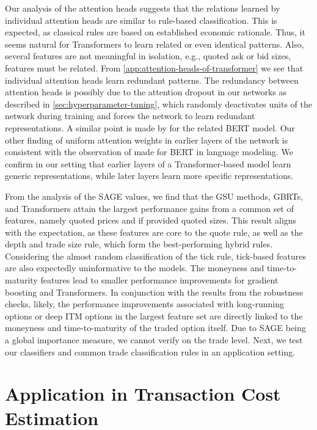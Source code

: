 Our analysis of the attention heads suggests that the relations learned by individual attention heads are similar to rule-based classification. This is expected, as classical rules are based on established economic rationale. Thus, it seems natural for Transformers to learn related or even identical patterns. Also, several features are not meaningful in isolation, e.g., quoted ask or bid sizes, features must be related. From \cref{app:attention-heads-of-transformer} we see that individual attention heads learn redundant patterns. The redundancy between attention heads is possibly due to the attention dropout in our networks as described in \cref{sec:hyperparameter-tuning}, which randomly deactivates units of the network during training and forces the network to learn redundant representations. A similar point is made by \textcite[][283--284]{clarkWhatDoesBERT2019} for the related \gls{BERT} model. Our other finding of uniform attention weights in earlier layers of the network is consistent with the observation of \textcite[][4193]{abnarQuantifyingAttentionFlow2020} made for \gls{BERT} in language modeling. We confirm in our setting that earlier layers of a Transformer-based model learn generic representations, while later layers learn more specific representations.

From the analysis of the \gls{SAGE} values, we find that the \gls{GSU} methods, \glspl{GBRT}, and Transformers attain the largest performance gains from a common set of features, namely quoted prices and if provided quoted sizes. This result aligns with the expectation, as these features are core to the quote rule, as well as the depth and trade size rule, which form the best-performing hybrid rules. Considering the almost random classification of the tick rule, tick-based features are also expectedly uninformative to the models. The moneyness and time-to-maturity features lead to smaller performance improvements for gradient boosting and Transformers. In conjunction with the results from the robustness checks, likely, the performance improvements associated with long-running options or deep \gls{ITM} options in the largest feature set are directly linked to the moneyness and time-to-maturity of the traded option itself. Due to \gls{SAGE} being a global importance measure, we cannot verify on the trade level. Next, we test our classifiers and common trade classification rules in an application setting.

\clearpage

\section{Application in Transaction Cost Estimation}\label{sec:application}

